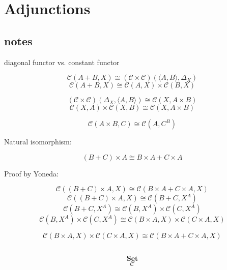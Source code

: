 \documentclass[DaoFP]{subfiles}
\begin{document}
\setcounter{chapter}{9}

\chapter{Adjunctions}



\section{notes}

diagonal functor vs. constant functor

\[  \mathcal{C} (A + B, X) \cong (\mathcal{C} \times \mathcal{C})( \langle A, B \rangle , \Delta_X)\]
\[  \mathcal{C} (A + B, X) \cong \mathcal{C}( A , X) \times \mathcal{C}( B , X)\]

\[  (\mathcal{C} \times \mathcal{C})( \Delta_X,  \langle A, B \rangle ) \cong  \mathcal{C} (X, A \times B)  \]
\[  \mathcal{C} (X, A) \times \mathcal{C}(X, B) \cong  \mathcal{C} (X, A \times B)  \]

\[  \mathcal{C}(A \times B, C ) \cong  \mathcal{C} (A, C^B)  \]


Natural isomorphism:

\[(B + C) \times A \cong B \times A + C \times A \]

Proof by Yoneda:

\[  \mathcal{C} ((B + C) \times A, X) \cong \mathcal{C}(B \times A + C \times A, X) \]
\[  \mathcal{C} ((B + C) \times A, X) \cong \mathcal{C}(B + C, X^A) \]
\[  \mathcal{C}(B + C, X^A) \cong \mathcal{C}(B, X^A) \times \mathcal{C}(C, X^A)\]
\[  \mathcal{C}(B, X^A) \times \mathcal{C}(C, X^A) \cong \mathcal{C}(B \times A, X) \times \mathcal{C}(C \times A, X)\]

\[ \mathcal{C}(B \times A, X) \times \mathcal{C}(C \times A, X) \cong \mathcal{C}(B \times A + C \times A, X) \]

\begin{exercise}
\end{exercise}
\begin{haskell}
\end{haskell}
\[
 \begin{tikzcd}
  \end{tikzcd}
\]

\[   \mathbf{Set} \]
\[   \mathcal{C} \]
\end{document}
